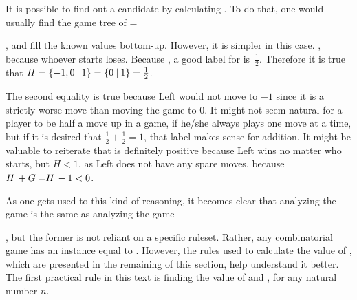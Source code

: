 It is possible to find out a candidate by calculating \Gm{ + \Hm + \Hm}. To do that, one would usually find the game tree of 
\Gm{ + \Hm + \Hm} = 
, and fill the known values bottom-up. However, it is simpler in this case. , because whoever starts loses. Because , a good label for \Hm is~$\frac{1}{2}$. Therefore it is true that $H = \mbox{$\{{-}1, 0\:|\:1\}$} = \mbox{$\{0\:|\:1\}$} = \frac{1}{2}$.

 The second equality is true because Left would not move to $-1$ since it is a strictly worse move than moving the game to $0$. It might not seem natural for a player to be half a move up in a game, if he/she always plays one move at a time, but if it is desired that $\frac{1}{2} + \frac{1}{2} = 1$, that label makes sense for addition. It might be valuable to reiterate that \Hm is definitely positive because Left wins no matter who starts, but $H < 1$, as Left does not have any spare moves, because $\mbox{$H\,$} + \mbox{$G=$} \mbox{$H\,$} - 1 < 0$.

As one gets used to this kind of reasoning, it becomes clear that analyzing the game  is the same as analyzing the game 
, but the former is not reliant on a specific ruleset. Rather, any combinatorial game has an instance equal to . However, the rules used to calculate the value of , which are presented in the remaining of this section, help understand it better. The first practical rule in this text is finding the value of  and , for any natural number $n$.

